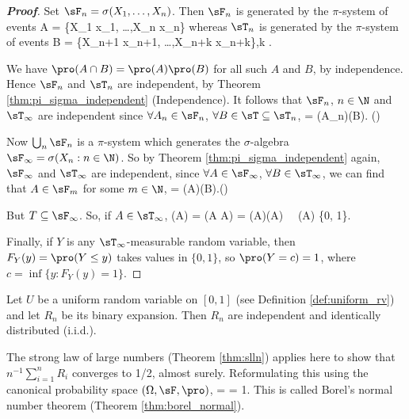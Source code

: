 \begin{proof}[\bf Proof]
Set $\sF_n = \sigma(X_1, \dots,X_n)$. Then $\sF_n$ is generated by the $\pi$-system of events
\be
A = \{X_1 \leq x_1, \dots ,X_n \leq x_n\}
\ee
whereas $\sT_n$ is generated by the $\pi$-system of events
\be
B = \{X_{n+1} \leq x_{n+1}, \dots ,X_{n+k} \leq x_{n+k}\},\quad k \in \N.
\ee

We have $\pro(A\cap B) = \pro(A)\pro(B)$ for all such $A$ and $B$, by independence. Hence $\sF_n$ and $\sT_n$ are independent, by Theorem \ref{thm:pi_sigma_independent} (Independence). It follows that $\sF_n$, $n\in\N$ and $\sT_\infty$ are independent since $\forall A_n \in \sF_n$, $\forall B\in \sT \subseteq \sT_n$,
\be
\pro{} = \pro(A_n)\pro(B). \quad\quad ()
\ee

Now $\bigcup_n \sF_n$ is a $\pi$-system which generates the $\sigma$-algebra $\sF_\infty = \sigma(X_n : n \in \N)$. So by Theorem \ref{thm:pi_sigma_independent} again, $\sF_\infty$ and $\sT_\infty$ are independent, since $\forall A \in \sF_\infty$, $\forall B\in \sT_\infty$, we can find that $A\in \sF_m$ for some $m\in \N$,
\be
\pro{} = \pro(A)\pro(B).\quad\quad ()
\ee

But $T \subseteq \sF_\infty$. So, if $A \in \sT_\infty$,
\be
\pro(A) = \pro(A \cap A) = \pro(A)\pro(A) \ \ra \ \pro(A) \in \{0, 1\}.
\ee

Finally, if $Y$ is any $\sT_\infty$-measurable random variable, then $F_Y (y) = \pro(Y \leq y)$ takes values in $\{0, 1\}$, so $\pro(Y = c) = 1$, where $c = \inf\{y : F_Y (y) = 1\}$.
\end{proof}


\begin{example}
Let $U$ be a uniform random variable on $[0, 1]$ (see Definition \ref{def:uniform_rv}) and let $R_n$ be its binary expansion. Then $R_n$ are independent and identically distributed (i.i.d.).

The strong law of large numbers (Theorem \ref{thm:slln}) applies here to show that $n^{-1}\sum^n_{i=1} R_i$ converges to 1/2, almost surely. Reformulating this using the canonical probability space $(\Omega, \sF, \pro)$,
\be
\pro\brb{\left\{\omega \in (0, 1]: \frac{|\{k \leq n : \omega_k = 1\}|}n \to \frac 12\right\}} = \pro{} = 1.
\ee
This is called Borel's normal number theorem (Theorem \ref{thm:borel_normal}).
\end{example}


